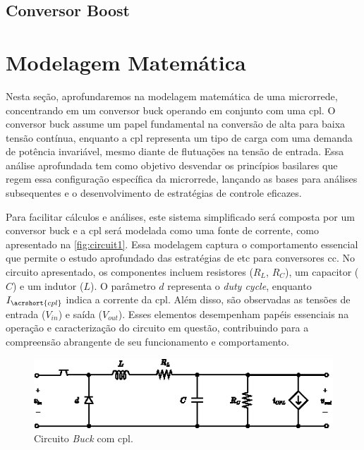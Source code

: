 \subsection{Conversor Boost}

\section{Modelagem Matemática}

Nesta seção, aprofundaremos na modelagem matemática de uma microrrede, concentrando em um conversor buck operando em conjunto com uma \acrshort{cpl}. O conversor buck assume um papel fundamental na conversão de alta para baixa tensão contínua, enquanto a \acrshort{cpl} representa um tipo de carga com uma demanda de potência invariável, mesmo diante de flutuações na tensão de entrada. Essa análise aprofundada tem como objetivo desvendar os princípios basilares que regem essa configuração específica da microrrede, lançando as bases para análises subsequentes e o desenvolvimento de estratégias de controle eficazes.

Para facilitar cálculos e análises, este sistema simplificado será composta por um conversor buck e a \acrshort{cpl} será modelada como uma fonte de corrente, como apresentado na \autoref{fig:circuit1}. Essa modelagem captura o comportamento essencial que permite o estudo aprofundado das estratégias de \acrshort{etc} para conversores \acrshort{cc}. No circuito apresentado, os componentes incluem resistores ($R_L$, $R_C$), um capacitor ($C$) e um indutor ($L$). O parâmetro $d$ representa o \textit{duty cycle}, enquanto $I_{\acrshort{cpl}}$ indica a corrente da \acrshort{cpl}. Além disso, são observadas as tensões de entrada ($V_{in}$) e saída ($V_{out}$). Esses elementos desempenham papéis essenciais na operação e caracterização do circuito em questão, contribuindo para a compreensão abrangente de seu funcionamento e comportamento.

\begin{figure}[H]
  \centering
  \includegraphics[scale=2.5]{figuras/buck_conversor_with_cpl_circuit.eps}
  \caption{Circuito \textit{Buck} com \acrshort{cpl}.}
  \label{fig:circuit1}
\end{figure}

